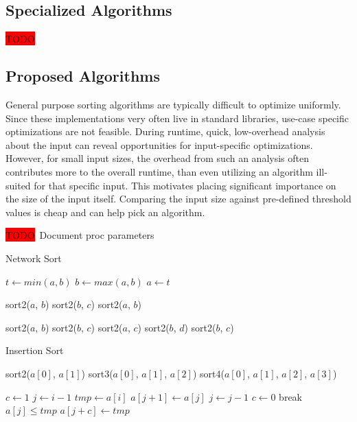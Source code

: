 \documentclass[letter, 12pt, conference]{ieeeconf}
\newcommand{\todo}{\colorbox{red}{TODO}}
\begin{document}
\subsection{Specialized Algorithms}

\todo

\subsection{Proposed Algorithms}

General purpose sorting algorithms are typically difficult to optimize
uniformly. Since these implementations very often live in standard libraries,
use-case specific optimizations are not feasible. During runtime, quick,
low-overhead analysis about the input can reveal opportunities for
input-specific optimizations. However, for small input sizes, the overhead from
such an analysis often contributes more to the overall runtime, than even
utilizing an algorithm ill-suited for that specific input. This motivates
placing significant importance on the size of the input itself. Comparing the
input size against pre-defined threshold values is cheap and can help pick an
algorithm.

\todo\ Document proc parameters

\begin{algorithm}[h]
	\caption{Network Sort}
	\label{alg:network_sort}
	\begin{algorithmic}
		\State $t \gets min(a, b)$
		\State $b \gets max(a, b)$
		\State $a \gets t$
		\EndProcedure

		\State sort2($a$, $b$)
		\State sort2($b$, $c$)
		\State sort2($a$, $b$)
		\EndProcedure

		\State sort2($a$, $b$)
		\State sort2($b$, $c$)
		\State sort2($a$, $c$)
		\State sort2($b$, $d$)
		\State sort2($b$, $c$)
		\EndProcedure
	\end{algorithmic}
\end{algorithm}

\begin{algorithm}[h]
	\caption{Insertion Sort}
	\label{alg:insertion_sort}
	\begin{algorithmic}
		\Procedure{ins\_sort}{a, n}
		\If {$n = 2$}
		\State sort2($a[0]$, $a[1]$)
		\State \Return
		\ElsIf {$n = 3$}
		\State sort3($a[0]$, $a[1]$, $a[2]$)
		\State \Return
		\ElsIf {$n = 4$}
		\State sort4($a[0]$, $a[1]$, $a[2]$, $a[3]$)
		\State \Return
		\EndIf

		\For {$i \gets 1$ to $n$}
		\State $c \gets 1$
		\State $j \gets i - 1$
		\If {$a[j] > a[j]$}
		\State $tmp \gets a[i]$
		\Repeat
		\State $a[j + 1] \gets a[j]$
		\State $j \gets j - 1$
		\If {$j = 0$}
		\State $c \gets 0$
		\State break
		\EndIf
		\Until $a[j] \le tmp$
		\State $a[j + c] \gets tmp$
		\EndIf
		\EndFor
		\EndProcedure
	\end{algorithmic}
\end{algorithm}
\end{document}

